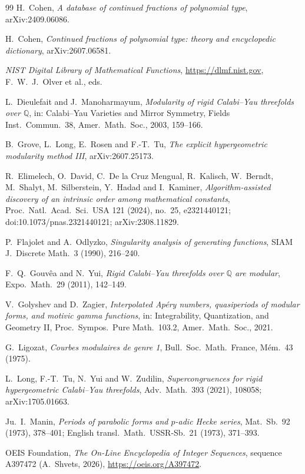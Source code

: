 \documentclass[11pt]{amsart}
\theoremstyle{definition}
\theoremstyle{remark}
\numberwithin{equation}{section}
\begin{document}
\begin{thebibliography}{99}
 H.~Cohen, \emph{A database of continued fractions of polynomial type}, arXiv:2409.06086.

 H.~Cohen, \emph{Continued fractions of polynomial type: theory and encyclopedic dictionary}, arXiv:2607.06581.

 \emph{NIST Digital Library of Mathematical Functions}, \url{https://dlmf.nist.gov}, F.~W.~J.~Olver et al., eds.

 L.~Dieulefait and J.~Manoharmayum, \emph{Modularity of rigid Calabi--Yau threefolds over $\mathbb Q$}, in: Calabi--Yau Varieties and Mirror Symmetry, Fields Inst.\ Commun.\ 38, Amer.\ Math.\ Soc., 2003, 159--166.

 B.~Grove, L.~Long, E.~Rosen and F.-T.~Tu, \emph{The explicit hypergeometric modularity method III}, arXiv:2607.25173.

 R.~Elimelech, O.~David, C.~De la Cruz Mengual, R.~Kalisch, W.~Berndt, M.~Shalyt, M.~Silberstein, Y.~Hadad and I.~Kaminer, \emph{Algorithm-assisted discovery of an intrinsic order among mathematical constants}, Proc.\ Natl.\ Acad.\ Sci.\ USA 121 (2024), no.~25, e2321440121; doi:10.1073/pnas.2321440121; arXiv:2308.11829.

 P.~Flajolet and A.~Odlyzko, \emph{Singularity analysis of generating functions}, SIAM J.\ Discrete Math.\ 3 (1990), 216--240.

 F.~Q.~Gouv\^ea and N.~Yui, \emph{Rigid Calabi--Yau threefolds over $\mathbb Q$ are modular}, Expo.\ Math.\ 29 (2011), 142--149.

 V.~Golyshev and D.~Zagier, \emph{Interpolated Ap\'ery numbers, quasiperiods of modular forms, and motivic gamma functions}, in: Integrability, Quantization, and Geometry II, Proc.\ Sympos.\ Pure Math.\ 103.2, Amer.\ Math.\ Soc., 2021.

 G.~Ligozat, \emph{Courbes modulaires de genre 1}, Bull.\ Soc.\ Math.\ France, M\'em.\ 43 (1975).

 L.~Long, F.-T.~Tu, N.~Yui and W.~Zudilin, \emph{Supercongruences for rigid hypergeometric Calabi--Yau threefolds}, Adv.\ Math.\ 393 (2021), 108058; arXiv:1705.01663.

 Ju.~I.~Manin, \emph{Periods of parabolic forms and $p$-adic Hecke series}, Mat.\ Sb.\ 92 (1973), 378--401; English transl.\ Math.\ USSR-Sb.\ 21 (1973), 371--393.

 OEIS Foundation, \emph{The On-Line Encyclopedia of Integer Sequences}, sequence A397472 (A.~Shvets, 2026), \url{https://oeis.org/A397472}.


\end{thebibliography}
\end{document}
